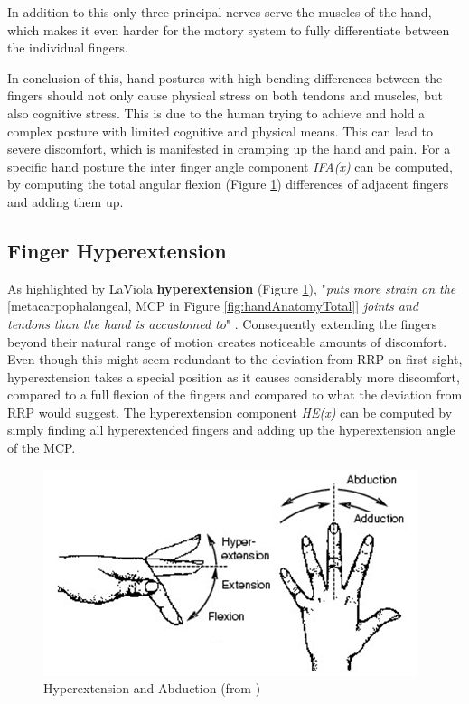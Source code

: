 In addition to this only three principal nerves serve the muscles of the hand, which makes it even harder for the motory system to fully differentiate between the individual fingers.

In conclusion of this, hand postures with high bending differences between the fingers should not only cause physical stress on both tendons and muscles, but also cognitive stress. This is due to the human trying to achieve and hold a complex posture with limited cognitive and physical means.
This can lead to severe discomfort, which is manifested in cramping up the hand and pain.
For a specific hand posture the inter finger angle component \textit{IFA(x)} can be computed, by computing the total angular flexion (Figure \ref{fig:hyperabduction}) differences of adjacent fingers and adding them up.

\subsection{Finger Hyperextension}

As highlighted by LaViola \cite{laviola1999survey} \textbf{hyperextension} (Figure \ref{fig:hyperabduction}), "\textit{puts more strain on the }[metacarpophalangeal, MCP in Figure \ref{fig:handAnatomyTotal}] \textit{joints and tendons than the hand is accustomed to}" \cite{laviola1999survey}. Consequently extending the fingers beyond their natural range of motion creates noticeable amounts of discomfort. Even though this might seem redundant to the deviation from RRP on first sight, hyperextension takes a special position as it causes considerably more discomfort, compared to a full flexion of the fingers and compared to what the deviation from RRP would suggest. The hyperextension component \textit{HE(x)} can be computed by simply finding all hyperextended fingers and adding up the hyperextension angle of the MCP. 

\begin{figure}
\centering
\includegraphics[width=\textwidth]{abduction}
\caption{Hyperextension and Abduction (from \cite{laviola1999survey})}
\label{fig:hyperabduction}
\end{figure}

